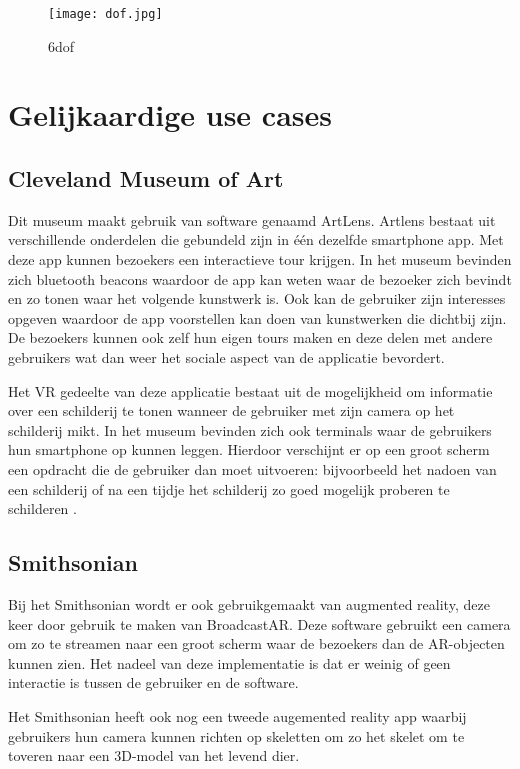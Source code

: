 \begin{figure}
    \texttt{[image: dof.jpg]}
    \caption{\acrfull{6dof} \autocite{6dofImage}}
    \label{fig:dof}
\end{figure}


\section{Gelijkaardige use cases}
\subsection{Cleveland Museum of Art}\label{ch:cleveland}
Dit museum maakt gebruik van software genaamd ArtLens. Artlens bestaat uit verschillende onderdelen die gebundeld zijn in één dezelfde smartphone app. Met deze app kunnen bezoekers een interactieve tour krijgen. In het museum bevinden zich bluetooth beacons waardoor de app kan weten waar de bezoeker zich bevindt en zo tonen waar het volgende kunstwerk is. Ook kan de gebruiker zijn interesses opgeven waardoor de app voorstellen kan doen van kunstwerken die dichtbij zijn. 
De bezoekers kunnen ook zelf hun eigen tours maken en deze delen met andere gebruikers wat dan weer het sociale aspect van de applicatie bevordert.

Het VR gedeelte van deze applicatie bestaat uit de mogelijkheid om informatie over een schilderij te tonen wanneer de gebruiker met zijn camera op het schilderij mikt.
In het museum bevinden zich ook terminals waar de gebruikers hun smartphone op kunnen leggen. Hierdoor verschijnt er op een groot scherm een opdracht die de gebruiker dan moet uitvoeren: bijvoorbeeld het nadoen van een schilderij of na een tijdje het schilderij zo goed mogelijk proberen te schilderen \autocite{Ding2017}.

\subsection{Smithsonian}
Bij het Smithsonian wordt er ook gebruikgemaakt van augmented reality, deze keer door gebruik te maken van BroadcastAR. Deze software gebruikt een camera om zo te streamen naar een groot scherm waar de bezoekers dan de AR-objecten kunnen zien. Het nadeel van deze implementatie is dat er weinig of geen interactie is tussen de gebruiker en de software. 

Het Smithsonian heeft ook nog een tweede augemented reality app waarbij gebruikers hun camera kunnen richten op skeletten om zo het skelet om te toveren naar een 3D-model van het levend dier.

